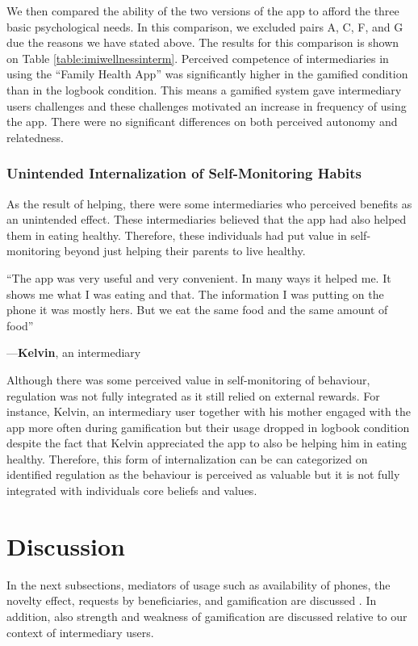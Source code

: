 \documentclass{sig-alternate}
\newenvironment{myquote}
               {\list{}{\rightmargin   \leftmargin
                        \parsep        0in }%
                \item\relax}
               {\endlist}
\newcommand{\userquote}[2]{\begin{samepage}\begin{myquote} 
     \em{\small{#2\begin{flushright}---#1\end{flushright}}}
   \end{myquote}\end{samepage}}
\begin{document}
We then compared the ability of the two versions of the app to afford the three basic psychological needs. In this comparison, we excluded pairs A, C, F, and G due the reasons we have stated above. The results for this comparison is shown on Table \ref{table:imiwellnessinterm}. Perceived competence of intermediaries in using the ``Family Health App'' was significantly higher in the gamified condition than in the logbook condition. This means a gamified system gave intermediary users challenges and these challenges motivated an increase in frequency of using the app. There were no significant differences on both perceived autonomy and relatedness. 
\subsubsection{Unintended Internalization of Self-Monitoring Habits}
As the result of helping, there were some intermediaries who perceived benefits as an unintended effect. These intermediaries believed that the app had also helped them in eating healthy. Therefore, these individuals had put value in self-monitoring beyond just helping their parents to live healthy. 

\userquote{\textbf{Kelvin}, an intermediary} {``The app was very useful and very convenient. In many ways it helped me.  It shows me what I was eating and that. The information I was putting on the phone it was mostly hers. But we eat the same food and the same amount of food''} 

Although there was some perceived value in self-monitoring of behaviour, regulation was not fully integrated as it still relied on external rewards. For instance, Kelvin, an intermediary user together with his mother engaged with the app more often during gamification but their usage dropped in logbook condition despite the fact that Kelvin appreciated the app to also be helping him in eating healthy. Therefore, this form of internalization can be can categorized on identified regulation as the behaviour is perceived as valuable but it is not fully integrated with individuals core beliefs and values.

\section{Discussion}
In the next subsections, mediators of usage such as availability of phones, the novelty effect, requests by beneficiaries, and gamification are discussed . In addition, also strength and weakness of gamification are discussed relative to our context of intermediary users.
\end{document}
